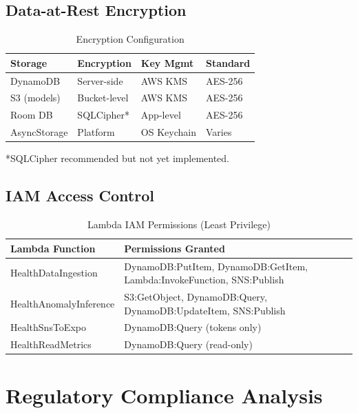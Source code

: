 \documentclass[conference]{IEEEtran}
\begin{document}
\subsection{Data-at-Rest Encryption}

\begin{table}[H]
\centering
\caption{Encryption Configuration}
\label{tab:encryption}
\begin{tabular}{llll}
\toprule
\textbf{Storage} & \textbf{Encryption} & \textbf{Key Mgmt} & \textbf{Standard} \\
\midrule
DynamoDB & Server-side & AWS KMS & AES-256 \\
S3 (models) & Bucket-level & AWS KMS & AES-256 \\
Room DB & SQLCipher* & App-level & AES-256 \\
AsyncStorage & Platform & OS Keychain & Varies \\
\bottomrule
\end{tabular}
\end{table}
*SQLCipher recommended but not yet implemented.

\subsection{IAM Access Control}

\begin{table}[H]
\centering
\caption{Lambda IAM Permissions (Least Privilege)}
\label{tab:iam}
\begin{tabular}{lp{4.5cm}}
\toprule
\textbf{Lambda Function} & \textbf{Permissions Granted} \\
\midrule
HealthDataIngestion & DynamoDB:PutItem, DynamoDB:GetItem, Lambda:InvokeFunction, SNS:Publish \\
HealthAnomalyInference & S3:GetObject, DynamoDB:Query, DynamoDB:UpdateItem, SNS:Publish \\
HealthSnsToExpo & DynamoDB:Query (tokens only) \\
HealthReadMetrics & DynamoDB:Query (read-only) \\
\bottomrule
\end{tabular}
\end{table}

\section{Regulatory Compliance Analysis}
\end{document}
